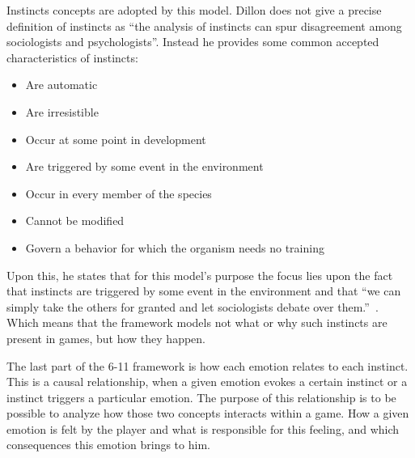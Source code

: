 Instincts concepts are adopted by this model. Dillon does not give a precise definition of instincts as ``the analysis of instincts can spur disagreement among sociologists and psychologists''\citep{dillon_way_2010}. Instead he provides some common accepted characteristics of instincts:
\begin{itemize}
    \item Are automatic
    \item Are irresistible
    \item Occur at some point in development
    \item Are triggered by some event in the environment
    \item Occur in every member of the species
    \item Cannot be modified
    \item Govern a behavior for which the organism needs no 
training
\end{itemize}



Upon this, he states that for this model's purpose the focus lies upon the fact that instincts are triggered by some event in the environment and that ``we can simply take the others for granted and let sociologists debate over them.''~\citep{dillon_way_2010}. Which means that the framework models not what or why such instincts are present in games, but how they happen.

The last part of the 6-11 framework is how each emotion relates to each instinct. This is a causal relationship, when a given emotion evokes a certain instinct or a instinct triggers a particular emotion. The purpose of this relationship is to be possible to analyze how those two concepts interacts within a game. How a given emotion is felt by the player and what is responsible for this feeling, and which consequences this emotion brings to him. 

